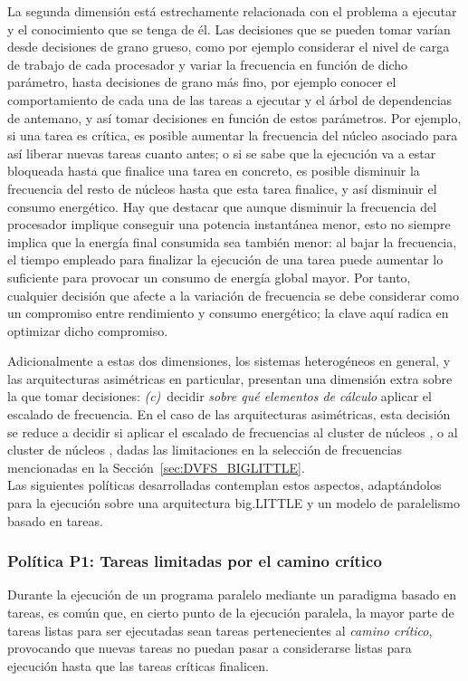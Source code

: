La segunda dimensión está estrechamente relacionada con el problema a
ejecutar y el conocimiento que se tenga de él. Las decisiones que se pueden
tomar varían desde decisiones de grano grueso, como por ejemplo considerar
el nivel de carga de trabajo de cada procesador y variar la frecuencia en
función de dicho parámetro, hasta decisiones de grano más fino, por ejemplo
conocer el comportamiento de cada una de las tareas a ejecutar y el árbol
de dependencias de antemano, y así tomar decisiones en función de estos
parámetros. Por ejemplo, si una tarea es crítica, es posible aumentar la
frecuencia del núcleo asociado para así liberar nuevas tareas cuanto antes;
o si se sabe que la ejecución va a estar bloqueada hasta que finalice una
tarea en concreto, es posible disminuir la frecuencia del resto de núcleos
hasta que esta tarea finalice, y así disminuir el consumo energético. Hay
que destacar que aunque disminuir la frecuencia del procesador implique
conseguir una potencia instantánea menor, esto no siempre implica que la
energía final consumida sea también menor: al bajar la frecuencia, el
tiempo empleado para finalizar la ejecución de una tarea puede aumentar lo
suficiente para provocar un consumo de energía global mayor. Por tanto,
cualquier decisión que afecte a la variación de frecuencia se debe
considerar como un compromiso entre rendimiento y consumo energético; la
clave aquí radica en optimizar dicho compromiso.

Adicionalmente a estas dos dimensiones, los sistemas heterogéneos en
general, y las arquitecturas asimétricas en particular, presentan una
dimensión extra sobre la que tomar decisiones: {\em (c)}~decidir {\em sobre
  qué elementos de cálculo} aplicar el escalado de frecuencia. En el caso
de las arquitecturas asimétricas, esta decisión se reduce a decidir si
aplicar el escalado de frecuencias al cluster de núcleos \BIG, o al cluster
de núcleos \LITTLE, dadas las limitaciones en la selección de frecuencias
mencionadas en la Sección~\ref{sec:DVFS_BIGLITTLE}.\\
Las siguientes políticas desarrolladas contemplan estos aspectos,
adaptándolos para la ejecución sobre una arquitectura big.LITTLE y un
modelo de paralelismo basado en tareas.

\subsubsection{Política P1: Tareas limitadas por el camino crítico}

Durante la ejecución de un programa paralelo mediante un paradigma basado
en tareas, es común que, en cierto punto de la ejecución paralela, la mayor
parte de tareas listas para ser ejecutadas sean tareas pertenecientes al
{\em camino crítico}, provocando que nuevas tareas no puedan pasar a
considerarse listas para ejecución hasta que las tareas críticas finalicen.

